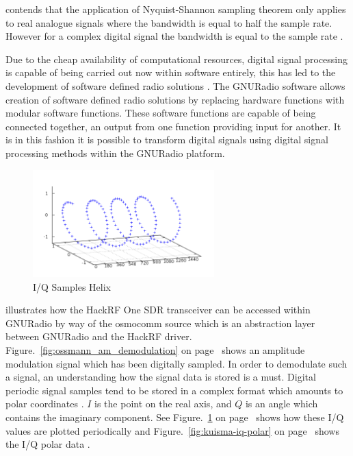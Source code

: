 \cite{ossmann-15-b} contends that the application of Nyquist-Shannon sampling theorem only applies to real analogue signals where the bandwidth is equal to half the sample rate. However for a complex digital signal  the bandwidth is equal to the sample rate \citep{ossmann-15-b}.

Due to the cheap availability of computational resources, digital signal processing is capable of being carried out now within software entirely, this has led to the development of software defined radio solutions \citep{freidt-13}. The GNURadio software allows creation of software defined radio solutions by replacing hardware functions with modular software functions. These software functions are capable of being connected together, an output from one function providing input for another. It is in this fashion it is possible to transform digital signals using digital signal processing methods within the GNURadio platform\citep{gnuradio-14}.

%
\begin{figure}[here]
\centering
\includegraphics[width=7cm]{images/48}
\caption{I/Q Samples Helix \citep{kuisma-14}}
\label{fig:kuisma-iq-helix}
\end{figure}
%

\cite{ossmann-15-a} illustrates how the HackRF One \gls{SDR} transceiver can be accessed within GNURadio by way of the osmocomm source which is an abstraction layer between GNURadio and the HackRF driver. Figure.~\ref{fig:ossmann_am_demodulation} on page~\pageref{fig:ossmann_am_demodulation} shows an amplitude modulation signal which has been digitally sampled. In order to demodulate such a signal, an understanding how the signal data is stored is a must. Digital periodic signal samples tend to be stored in a complex format which amounts to polar coordinates \citep{ossmann-15-c}. $I$ is the point on the real axis, and $Q$ is an angle which contains the imaginary component. See Figure.~\ref{fig:kuisma-iq-helix} on page~\pageref{fig:kuisma-iq-helix} shows how these I/Q values are plotted periodically and Figure.~\ref{fig:kuisma-iq-polar} on page~\pageref{fig:kuisma-iq-polar} shows the I/Q polar data \cite{kuisma-14}.

